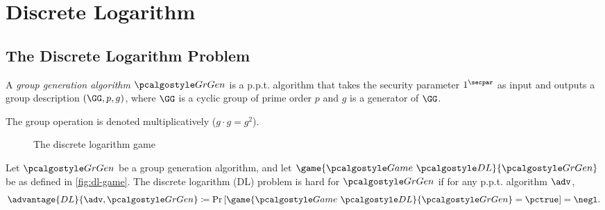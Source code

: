 \section{Discrete Logarithm}\label{sec:discrete-log}

\subsection{The Discrete Logarithm Problem}

\begin{definition}
  A \emph{group generation algorithm} $\grgen$ is a p.p.t. algorithm that takes the security parameter $1^\secpar$ as input and outputs a group description $(\GG, p, g)$, where $\GG$ is a cyclic group of prime order $p$ and $g$ is a generator of $\GG$.
\end{definition}

\begin{remark}
  The group operation is denoted multiplicatively ($g\cdot g = g^2$).
\end{remark}


\begin{figure}[tbhp]
  \begin{center}
    \begin{tcolorbox}[width=5cm]
      \begin{pchstack}[center]
      \end{pchstack}
    \end{tcolorbox}
  \end{center}
  \caption{The discrete logarithm game\label{fig:dl-game}}
\end{figure}

\begin{definition}
  Let $\grgen$ be a group generation algorithm, and let $\game{\Game~\algo{DL}}{\grgen}$ be as defined in \autoref{fig:dl-game}.
  The discrete logarithm (DL) problem is hard for $\grgen$ if for any p.p.t. algorithm $\adv$,
  \[
  \advantage{DL}{\adv, \grgen} \defeq \pr{\game{\Game~\algo{DL}}{\grgen} = \pctrue} = \negl.
  \]
\end{definition}


